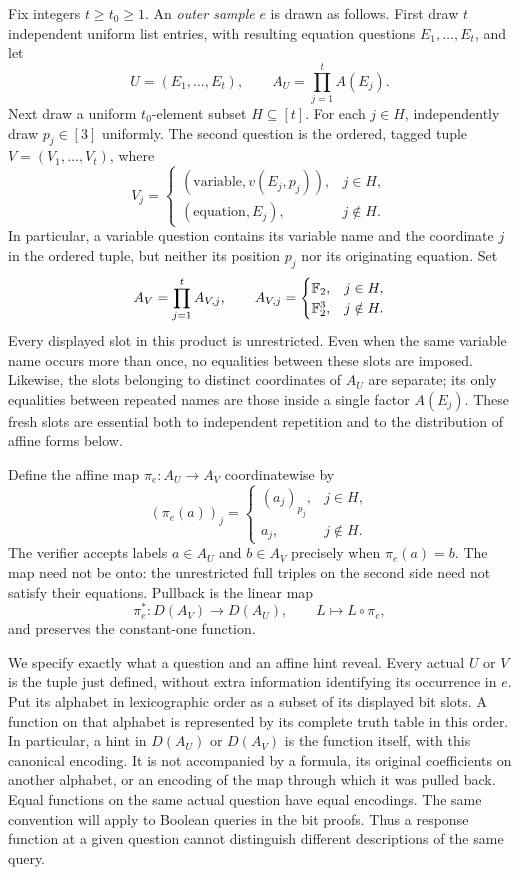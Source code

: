 Fix integers $t\ge t_0\ge1$. An \emph{outer sample} $e$ is drawn as follows.
First draw $t$ independent uniform list entries, with resulting equation
questions $E_1,\ldots,E_t$, and let
\[
 U=(E_1,\ldots,E_t),\qquad A_U=\prod_{j=1}^t A(E_j).
\]
Next draw a uniform $t_0$-element subset $H\subseteq[t]$. For each $j\in H$,
independently draw $p_j\in[3]$ uniformly. The second question is the ordered,
tagged tuple $V=(V_1,\ldots,V_t)$, where
\[
 V_j=\begin{cases}
       (\mathrm{variable},v(E_j,p_j)),&j\in H,\\
       (\mathrm{equation},E_j),&j\notin H.
     \end{cases}
\]
In particular, a variable question contains its variable name and the
coordinate $j$ in the ordered tuple, but neither its position $p_j$ nor
its originating equation. Set
\[
 A_V=\prod_{j=1}^t A_{V,j},\qquad
 A_{V,j}=\begin{cases}\mathbb F_2,&j\in H,\\\mathbb F_2^3,&j\notin H.\end{cases}
\]
Every displayed slot in this product is unrestricted. Even when the same
variable name occurs more than once, no equalities between these slots are
imposed. Likewise, the slots belonging to distinct coordinates of $A_U$
are separate; its only equalities between repeated names are those inside
a single factor $A(E_j)$. These fresh slots are essential both to independent
repetition and to the distribution of affine forms below.

Define the affine map $\pi_e:A_U\to A_V$ coordinatewise by
\begin{equation}\label{eq:outer-projection}
 (\pi_e(a))_j=\begin{cases}(a_j)_{p_j},&j\in H,\\a_j,&j\notin H.\end{cases}
\end{equation}
The verifier accepts labels $a\in A_U$ and $b\in A_V$ precisely when
$\pi_e(a)=b$. The map need not be onto: the unrestricted full triples on
the second side need not satisfy their equations. Pullback is the linear
map
\[
 \pi_e^*:D(A_V)\longrightarrow D(A_U),\qquad L\longmapsto L\circ\pi_e,
\]
and preserves the constant-one function.

We specify exactly what a question and an affine hint reveal. Every actual
$U$ or $V$ is the tuple just defined, without extra information identifying
its occurrence in $e$. Put its alphabet in lexicographic order as a subset
of its displayed bit slots. A function on that alphabet is represented by
its complete truth table in this order. In particular, a hint in $D(A_U)$
or $D(A_V)$ is the function itself, with this canonical encoding. It is not
accompanied by a formula, its original coefficients on another alphabet,
or an encoding of the map through which it was pulled back. Equal functions
on the same actual question have equal encodings. The same convention will
apply to Boolean queries in the bit proofs. Thus a response function at a
given question cannot distinguish different descriptions of the same query.

